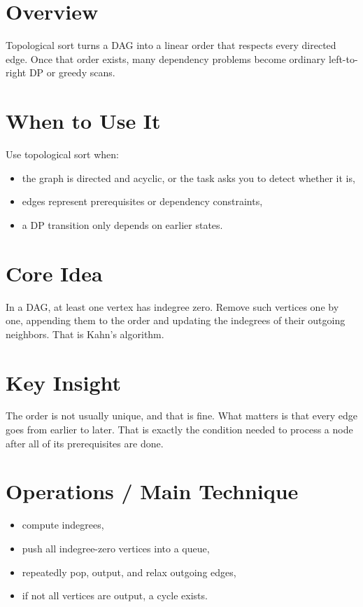 \section*{Overview}

Topological sort turns a DAG into a linear order that respects every directed edge. Once that order exists, many
dependency problems become ordinary left-to-right DP or greedy scans.

\section*{When to Use It}

Use topological sort when:

\begin{itemize}
  \item the graph is directed and acyclic, or the task asks you to detect whether it is,
  \item edges represent prerequisites or dependency constraints,
  \item a DP transition only depends on earlier states.
\end{itemize}

\section*{Core Idea}

In a DAG, at least one vertex has indegree zero. Remove such vertices one by one, appending them to the order and
updating the indegrees of their outgoing neighbors. That is Kahn's algorithm.

\section*{Key Insight}

The order is not usually unique, and that is fine. What matters is that every edge goes from earlier to later. That is
exactly the condition needed to process a node after all of its prerequisites are done.

\section*{Operations / Main Technique}

\begin{itemize}
  \item compute indegrees,
  \item push all indegree-zero vertices into a queue,
  \item repeatedly pop, output, and relax outgoing edges,
  \item if not all vertices are output, a cycle exists.
\end{itemize}

